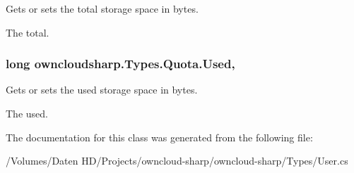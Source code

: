 Gets or sets the total storage space in bytes. 

The total.\hypertarget{classowncloudsharp_1_1_types_1_1_quota_ad02ad456c3c3a6160c5d4eb18d81e515}{}
\subsubsection[{Used}]{\setlength{\rightskip}{0pt plus 5cm}long owncloudsharp.\+Types.\+Quota.\+Used\hspace{0.3cm}{\ttfamily [get]}, {\ttfamily [set]}}\label{classowncloudsharp_1_1_types_1_1_quota_ad02ad456c3c3a6160c5d4eb18d81e515}


Gets or sets the used storage space in bytes. 

The used.

The documentation for this class was generated from the following file\+:\begin{DoxyCompactItemize}
\item 
/\+Volumes/\+Daten H\+D/\+Projects/owncloud-\/sharp/owncloud-\/sharp/\+Types/User.\+cs\end{DoxyCompactItemize}
